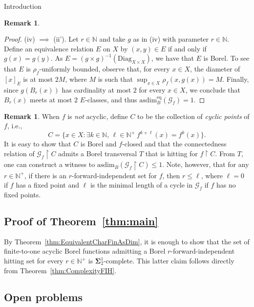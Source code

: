 \documentclass[psamsfonts]{amsart}
\theoremstyle{definition}
\newtheorem{remark}[thm]{Remark}
\newcommand{\N}{\mathbb N}
\newcommand{\asdim}{\text{asdim}}
\theoremstyle{remark}
\numberwithin{equation}{section}
\newcommand{\rest}{\restriction}
\newcommand\mbf{\mathbf}
\newcommand\mcal{\mathcal}
\begin{document}
\begin{section}{Introduction}
\begin{remark}
\begin{proof}
    \medskip

    (iv) $\implies$ (ii').
    Let $r\in \mathbb{N}$ and take $g$ as in (iv) with parameter $r\in \mathbb{N}$.
    Define an equivalence relation $E$ on $X$ by $(x,y)\in E$ if and only if $g(x) = g(y)$.
    As $E=(g\times g)^{-1}(\text{Diag}_{X\times X})$, we have that $E$ is Borel.
    To see that $E$ is $\rho_f$-uniformly bounded, observe that, for every $x \in X$, the diameter of $[x]_E$ is at most $2M$, where $M$ is such that $\sup_{x \in X} \rho_f(x, g(x)) = M$.
    Finally, since $g(B_r(x))$ has cardinality at most $2$ for every $x\in X$, we conclude that $B_r(x)$ meets at most $2$ $E$-classes, and thus $\asdim^{\text{eq}}_B(\mcal{G}_f)= 1$.   
    \end{proof}
    \end{remark}

    

    \begin{remark}
        When $f$ is \emph{not} acyclic, define $C$ to be the collection of \emph{cyclic points} of $f$, i.e.,
        $$C=\{x\in X:\exists k \in \N, \, \ell \in \N^+ \ f^{k+\ell}(x)=f^k(x)\}.$$
        It is easy to show that $C$ is Borel and $f$-closed and that the connectedness relation of $\mcal{G}_f \rest C$ admits a Borel transversal $T$ that is hitting for $f \rest C$.
        From $T$, one can construct a witness to $\asdim_B(\mcal{G}_f \rest C) \leq 1$.
        Note, however, that for any $r \in \N^+$, if there is an $r$-forward-independent set for $f$, then $r \leq \ell$, where $\ell = 0$ if $f$ has a fixed point and $\ell$ is the minimal length of a cycle in $\mcal{G}_f$ if $f$ has no fixed points.
    \end{remark}
    
    \subsection{Proof of Theorem~\ref{thm:main}}
    \label{subsec:MainThm}
    By Theorem~\ref{thm:EquivalentCharFinAsDim}, it is enough to show that the set of finite-to-one acyclic Borel functions admitting a Borel $r$-forward-independent hitting set for every $r\in \N^+$ is $\mbf{\Sigma}^1_2$-complete.
    This latter claim follows directly from Theorem~\ref{thm:ComplexityFIH}.

\section{Open problems}
\label{sec:OpenProbs}


\end{section}
\end{document}
